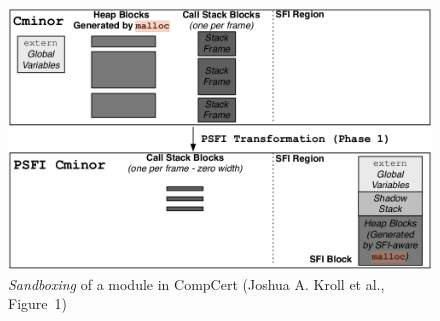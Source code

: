 \documentclass[11pt]{sdm}
\begin{document}
\begin{figure}
\centering
\includegraphics[scale=0.36]{images/psfi.png}
\caption{\textit{Sandboxing} of a module in CompCert (Joshua A. Kroll et al., Figure~1)}
\label{psfi}
\end{figure}
\end{document}

